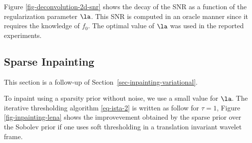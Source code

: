 



Figure \ref{fig-deconvolution-2d-snr} shows the decay of the SNR as a function of the regularization parameter $\la$. This SNR is computed in an oracle manner since it requires the knowledge of $f_0$. The optimal value of $\la$ was used in the reported experiments. 






\subsection{Sparse Inpainting}

This section is a follow-up of Section~\ref{sec-inpainting-variational}.

To inpaint using a sparsity prior without noise, we use a small value for $\la$. 
The iterative thresholding algorithm \eqref{eq-ista-2} is written as follow for $\tau=1$,
Figure \ref{fig-inpainting-lena} shows the improvevement obtained by the sparse prior over the Sobolev prior if one uses soft thresholding in a translation invariant wavelet frame. 

